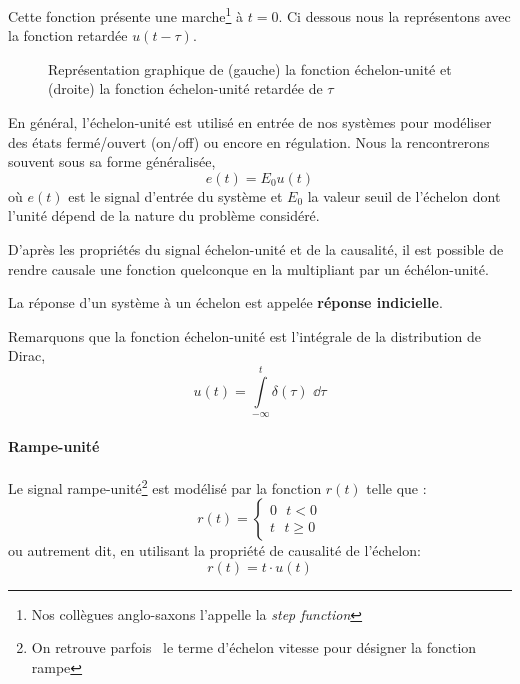 Cette fonction présente une marche\footnote{Nos 
collègues anglo-saxons l'appelle la \og\emph{step function}\fg} à $t=0$. 
Ci dessous nous la représentons avec la fonction retardée $u(t-\tau)$.
\begin{figure}[!h]
\begin{center}

\end{center}
\caption{Représentation graphique de (gauche) la fonction échelon-unité 
         et (droite) la fonction échelon-unité retardée de $\tau$
         \label{fig-echelon}}
\end{figure}

En général, l'échelon-unité est utilisé en entrée de nos systèmes pour 
modéliser des états fermé/ouvert (\og on/off\fg) ou encore en régulation.
Nous la rencontrerons souvent sous sa forme généralisée, 
$$
e(t)=E_0u(t)
$$
où $e(t)$ est le signal d'entrée du système et $E_0$ la valeur seuil 
de l'échelon dont l'unité dépend de la nature du problème considéré.

D'après les propriétés du signal échelon-unité et de la causalité, il 
est possible de rendre causale une fonction quelconque en la 
multipliant par un échélon-unité.

La réponse d'un système à un échelon est appelée 
\textbf{réponse indicielle}.

Remarquons que la fonction échelon-unité est l'intégrale 
de la distribution de Dirac,
$$
u(t)=\int\limits_{-\infty}^{t} \delta(\tau)\,\,\dd{\tau}
$$

\paragraph{Rampe-unité}
Le signal rampe-unité\footnote{On retrouve parfois~\cite{sueurautomatique} 
le terme d'échelon vitesse pour désigner la fonction rampe} est
modélisé par la fonction $r(t)$ telle que :
$$
r(t)=
\begin{cases}
	0\,\,\,\,t<0 \\
	t\,\,\,\,t\geq0 
\end{cases}
$$
ou autrement dit, en utilisant la propriété de causalité de l'échelon:
$$
r(t)=t\cdot u(t)
$$

